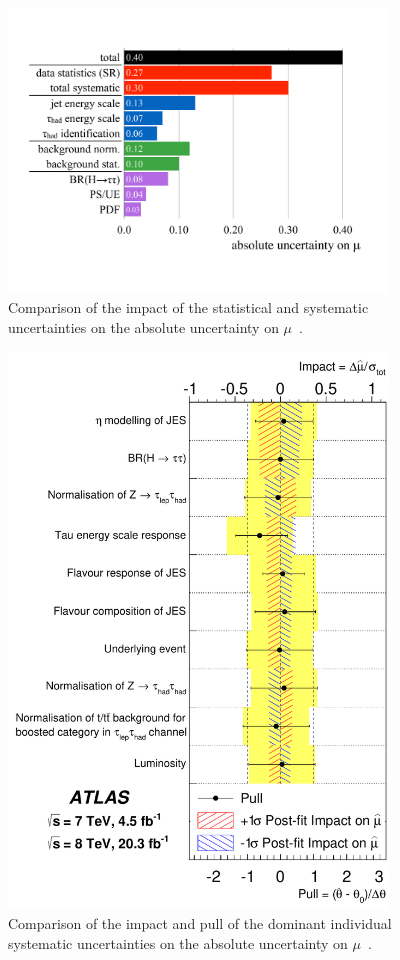 \begin{figure}[tp]
  \centering
  \includegraphics[width=0.90\textwidth]{figures/HIGG-2013-32/uncertainties}
  \caption{Comparison of the impact of the statistical and systematic uncertainties on the absolute uncertainty on $\mu$~\cite{HIGG-2013-32}.}
  \label{fig:results-uncertainties-1}
\end{figure}

\begin{figure}[tp]
  \centering
  \includegraphics[width=0.90\textwidth]{figures/HIGG-2013-32/fig_07}
  \caption{Comparison of the impact and pull of the dominant individual systematic uncertainties on the absolute uncertainty on $\mu$~\cite{HIGG-2013-32}.}
  \label{fig:results-uncertainties-2}
\end{figure}

